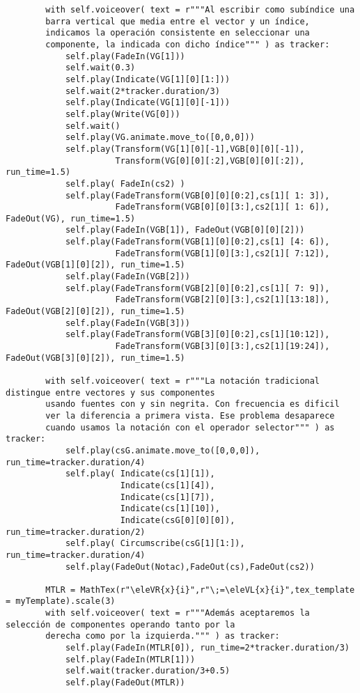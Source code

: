 \documentclass[11pt]{article}
\begin{document}
\begin{verbatim}
        with self.voiceover( text = r"""Al escribir como subíndice una
        barra vertical que media entre el vector y un índice,
        indicamos la operación consistente en seleccionar una
        componente, la indicada con dicho índice""" ) as tracker:
            self.play(FadeIn(VG[1]))
            self.wait(0.3)
            self.play(Indicate(VG[1][0][1:]))
            self.wait(2*tracker.duration/3)
            self.play(Indicate(VG[1][0][-1]))
            self.play(Write(VG[0]))
            self.wait()
            self.play(VG.animate.move_to([0,0,0]))
            self.play(Transform(VG[1][0][-1],VGB[0][0][-1]),
                      Transform(VG[0][0][:2],VGB[0][0][:2]), run_time=1.5)
            self.play( FadeIn(cs2) )
            self.play(FadeTransform(VGB[0][0][0:2],cs[1][ 1: 3]),
                      FadeTransform(VGB[0][0][3:],cs2[1][ 1: 6]), FadeOut(VG), run_time=1.5)
            self.play(FadeIn(VGB[1]), FadeOut(VGB[0][0][2]))
            self.play(FadeTransform(VGB[1][0][0:2],cs[1] [4: 6]),
                      FadeTransform(VGB[1][0][3:],cs2[1][ 7:12]), FadeOut(VGB[1][0][2]), run_time=1.5)
            self.play(FadeIn(VGB[2]))
            self.play(FadeTransform(VGB[2][0][0:2],cs[1][ 7: 9]),
                      FadeTransform(VGB[2][0][3:],cs2[1][13:18]), FadeOut(VGB[2][0][2]), run_time=1.5)
            self.play(FadeIn(VGB[3]))
            self.play(FadeTransform(VGB[3][0][0:2],cs[1][10:12]),
                      FadeTransform(VGB[3][0][3:],cs2[1][19:24]), FadeOut(VGB[3][0][2]), run_time=1.5)
            
        with self.voiceover( text = r"""La notación tradicional distingue entre vectores y sus componentes
        usando fuentes con y sin negrita. Con frecuencia es dificil
        ver la diferencia a primera vista. Ese problema desaparece
        cuando usamos la notación con el operador selector""" ) as tracker:
            self.play(csG.animate.move_to([0,0,0]),  run_time=tracker.duration/4)
            self.play( Indicate(cs[1][1]),
                       Indicate(cs[1][4]),
                       Indicate(cs[1][7]),
                       Indicate(cs[1][10]),
                       Indicate(csG[0][0][0]), run_time=tracker.duration/2)
            self.play( Circumscribe(csG[1][1:]),   run_time=tracker.duration/4)
            self.play(FadeOut(Notac),FadeOut(cs),FadeOut(cs2))

        MTLR = MathTex(r"\eleVR{x}{i}",r"\;=\eleVL{x}{i}",tex_template = myTemplate).scale(3)
        with self.voiceover( text = r"""Además aceptaremos la selección de componentes operando tanto por la
        derecha como por la izquierda.""" ) as tracker:   
            self.play(FadeIn(MTLR[0]), run_time=2*tracker.duration/3)
            self.play(FadeIn(MTLR[1]))
            self.wait(tracker.duration/3+0.5)
            self.play(FadeOut(MTLR))
            
\end{verbatim}
\end{document}
